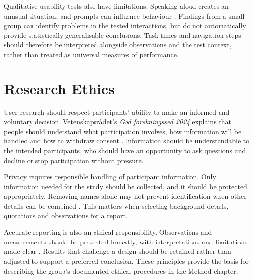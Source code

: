 Qualitative usability tests also have limitations. Speaking aloud creates
an unusual situation, and prompts can influence behaviour
\cite[Sec.~``Downsides of Think-Aloud'']{nielsenthinkaloud}.
Findings from a small group can identify problems in the tested interactions,
but do not automatically provide statistically generalisable conclusions.
Task times and navigation steps should therefore be interpreted alongside
observations and the test context, rather than treated as universal measures
of performance.

\section{Research Ethics}
\label{sec:research-ethics}

User research should respect participants' ability to make an informed and
voluntary decision. Vetenskapsr\aa{}det's \emph{God forskningssed 2024}
explains that people should understand what participation involves, how
information will be handled and how to withdraw consent
\cite[pp.~62--63]{vetenskapsradet2024}. Information should be understandable
to the intended participants, who should have an opportunity to ask questions
and decline or stop participation without pressure.

Privacy requires responsible handling of participant information. Only
information needed for the study should be collected, and it should be
protected appropriately. Removing names alone may not prevent identification
when other details can be combined \cite[pp.~66--67]{vetenskapsradet2024}.
This matters when selecting background details, quotations and observations
for a report.

Accurate reporting is also an ethical responsibility. Observations and
measurements should be presented honestly, with interpretations and
limitations made clear \cite[pp.~11--12]{vetenskapsradet2024}.
Results that challenge a design should be retained rather than adjusted to
support a preferred conclusion. These principles provide the basis for
describing the group's documented ethical procedures in the Method chapter.
